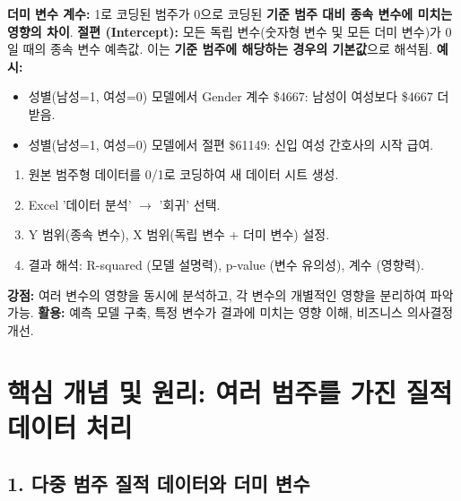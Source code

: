 \documentclass[11pt,a4paper]{book}
\theoremstyle{definition}
\begin{document}
\begin{tcolorbox}[colback=orange!5!white, colframe=orange!75!black, title={\textbf{회귀 계수 및 절편 해석}}]
\textbf{더미 변수 계수:} 1로 코딩된 범주가 0으로 코딩된 \textbf{기준 범주 대비 종속 변수에 미치는 영향의 차이}.
\textbf{절편 (Intercept):} 모든 독립 변수(숫자형 변수 및 모든 더미 변수)가 0일 때의 종속 변수 예측값. 이는 \textbf{기준 범주에 해당하는 경우의 기본값}으로 해석됨.
\textbf{예시:}
\begin{itemize}
    \item 성별(남성=1, 여성=0) 모델에서 Gender 계수 \$4667: 남성이 여성보다 \$4667 더 받음.
    \item 성별(남성=1, 여성=0) 모델에서 절편 \$61149: 신입 여성 간호사의 시작 급여.
\end{itemize}
\end{tcolorbox}

\begin{tcolorbox}[colback=teal!5!white, colframe=teal!75!black, title={\textbf{Excel 활용 절차}}]
\begin{enumerate}
    \item 원본 범주형 데이터를 0/1로 코딩하여 새 데이터 시트 생성.
    \item Excel '데이터 분석' $\rightarrow$ '회귀' 선택.
    \item Y 범위(종속 변수), X 범위(독립 변수 + 더미 변수) 설정.
    \item 결과 해석: R-squared (모델 설명력), p-value (변수 유의성), 계수 (영향력).
\end{enumerate}
\end{tcolorbox}

\begin{tcolorbox}[colback=gray!5!white, colframe=gray!75!black, title={\textbf{회귀 분석의 가치}}]
\textbf{강점:} 여러 변수의 영향을 동시에 분석하고, 각 변수의 개별적인 영향을 분리하여 파악 가능.
\textbf{활용:} 예측 모델 구축, 특정 변수가 결과에 미치는 영향 이해, 비즈니스 의사결정 개선.
\end{tcolorbox}


\section{핵심 개념 및 원리: 여러 범주를 가진 질적 데이터 처리}

\subsection{1. 다중 범주 질적 데이터와 더미 변수}
\end{document}

